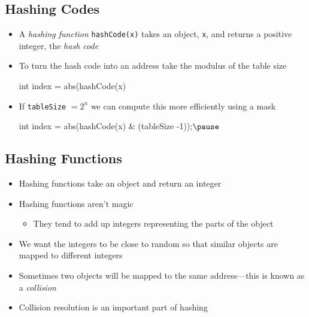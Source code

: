 
\begin{slide}
\section{Hashing Codes}

\begin{PauseHighLight}
  \begin{itemize}
  \item A \emph{hashing function} \texttt{hashCode(x)} takes an object,
    \texttt{x}, and returns a positive integer, the \emph{hash code}\pause
  \item To turn the hash code into an address take the modulus of the
    table size
    \begin{java}
      int index = abs(hashCode(x) %
    \end{java}
  \item If \texttt{tableSize} $=2^n$ we can compute this more
    efficiently using a mask
    \begin{java}
      int index = abs(hashCode(x) & (tableSize -1));$\pause$
    \end{java}
  \end{itemize}
\end{PauseHighLight}
\end{slide}


\begin{slide}
\section[-2]{Hashing Functions}

\begin{PauseHighLight}
  \begin{itemize}\squeeze
  \item Hashing functions take an object and return an integer\pause
  \item Hashing functions aren't magic\pause
    \begin{itemize}
    \item They tend to add up integers representing the parts of the
      object\pause
    \end{itemize}
  \item We want the integers to be close to random so that similar
    objects are mapped to different integers\pause
  \item Sometimes two objects will be mapped to the same
    address\pause---this is known as a \emph{collision}\pause
  \item Collision resolution is an important part of hashing\pause
  \end{itemize}
\end{PauseHighLight}

\end{slide}

